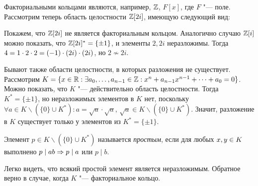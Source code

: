 \begin{example}
	Факториальными кольцами являются, например, $\mathbb{Z}$, $F[x]$, где $F$ "--- поле. Рассмотрим теперь область целостности $\mathbb{Z}[2i]$, имеющую следующий вид:
	\begin{center}
	\end{center}
	
	Покажем, что $\mathbb{Z}[2i]$ не является факториальным кольцом. Аналогично случаю $\mathbb{Z}[i]$ можно показать, что $\mathbb{Z}[2i]^* = \{\pm1\}$, и элементы $2, 2i$ неразложимы. Тогда $4 = 1 \cdot 2 \cdot 2 \hm= (-1)\cdot (2i) \cdot (2i)$, но $2 \not\sim 2i$.
\end{example}

\begin{note}
	Бывают также области целостности, в которых разложения не существует. Рассмотрим $K = \{x \in \mathbb{R}: \exists a_0, \dotsc, a_{n - 1} \in \mathbb{Z}: x^n + a_{n-1}x^{n-1} + \dotsb + a_0 = 0\}$. Можно показать, что $K$ "--- действительно область целостности. Тогда $K^* = \{\pm1\}$, но неразложимых элементов в $K$ нет, поскольку $\forall a \in K \backslash (\{0\} \cup K^*): a = \sqrt{a} \cdot \sqrt{a}$, $\sqrt{a} \in K \backslash (\{0\} \cup K^*)$. Значит, разложение в $K$ существует только у элементов из $K^* = \{\pm1\}$.
\end{note}

\begin{definition}
	Элемент $p \in K \backslash (\{0\} \cup K^*)$ называется \textit{простым}, если для любых $x, y \hm\in K$ выполнено $p \mid ab \Rightarrow p \mid a$ или $p \mid b$.
\end{definition}

\begin{note}
	Легко видеть, что всякий простой элемент является неразложимым. Обратное верно в случае, когда $K$ "--- факториальное кольцо.
\end{note}

